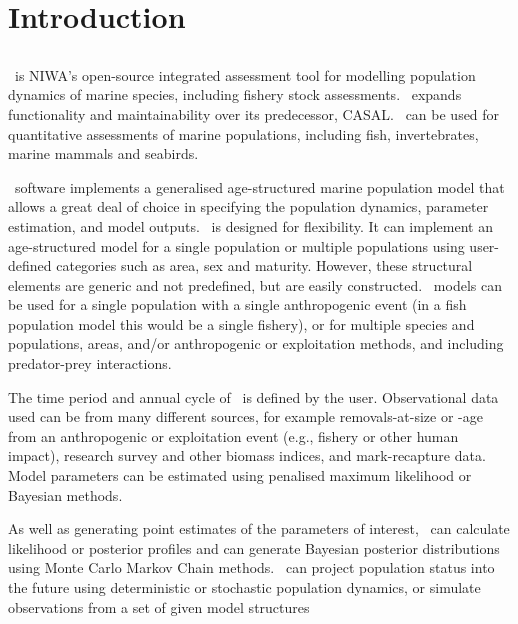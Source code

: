 \section{Introduction\label{sec:Introduction}}

\subsection{}

\CNAME\ is NIWA's open-source integrated assessment tool for modelling population dynamics of marine species, including fishery stock assessments. \CNAME\ expands functionality and maintainability over its predecessor, CASAL. \CNAME\ can be used for quantitative assessments of marine populations, including fish, invertebrates, marine mammals and seabirds.

\CNAME\ software implements a generalised age-structured marine population model that allows a great deal of choice in specifying the population dynamics, parameter estimation, and model outputs. \CNAME\ is designed for flexibility. It can implement an age-structured model for a single population or multiple populations using user-defined categories such as area, sex and maturity. However, these structural elements are generic and not predefined, but are easily constructed. \CNAME\ models can be used for a single population with a single anthropogenic event (in a fish population model this would be a single fishery), or for multiple species and populations, areas, and/or anthropogenic or exploitation methods, and including predator-prey interactions.

The time period and annual cycle of \CNAME\ is defined by the user. Observational data used can be from many different sources, for example removals-at-size or -age from an anthropogenic or exploitation event (e.g., fishery or other human impact), research survey and other biomass indices, and mark-recapture data. Model parameters can be estimated using penalised maximum likelihood or Bayesian methods.

As well as generating point estimates of the parameters of interest, \CNAME\ can calculate likelihood or posterior profiles and can generate Bayesian posterior distributions using Monte Carlo Markov Chain methods. \CNAME\ can project population status into the future using deterministic or stochastic population dynamics, or simulate observations from a set of given model structures

\subsection{}

